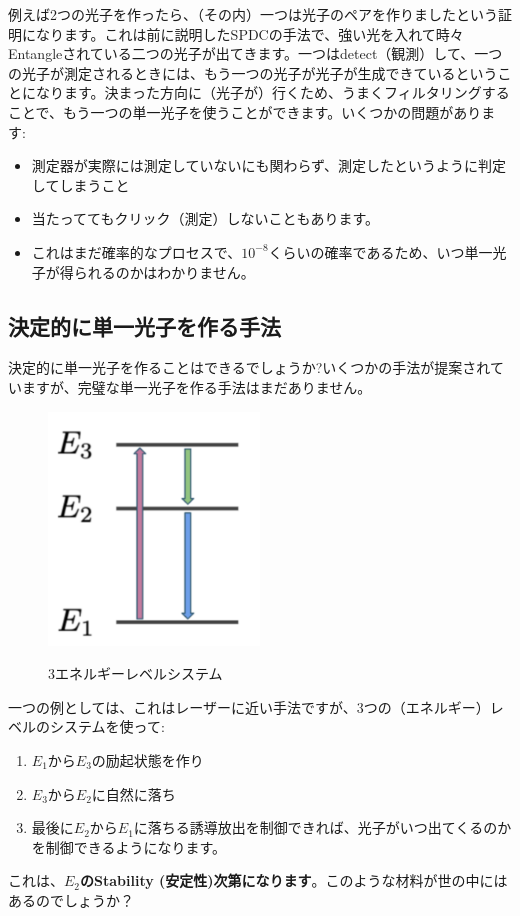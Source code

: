 例えば2つの光子を作ったら、（その内）一つは光子のペアを作りましたという証明になります。これは前に説明したSPDCの手法で、強い光を入れて時々Entangleされている二つの光子が出てきます。一つはdetect（観測）して、一つの光子が測定されるときには、もう一つの光子が光子が生成できているということになります。決まった方向に（光子が）行くため、うまくフィルタリングすることで、もう一つの単一光子を使うことができます。いくつかの問題があります:
\begin{itemize}
    \item 測定器が実際には測定していないにも関わらず、測定したというように判定してしまうこと
    \item 当たっててもクリック（測定）しないこともあります。
    \item これはまだ確率的なプロセスで、$10^{-8}$くらいの確率であるため、いつ単一光子が得られるのかはわかりません。
\end{itemize}
\subsection{決定的に単一光子を作る手法}
決定的に単一光子を作ることはできるでしょうか?いくつかの手法が提案されていますが、完璧な単一光子を作る手法はまだありません。
\begin{figure}[H]
    \centering
    \includegraphics[width=0.5\textwidth]{lesson5/3_stage_arrows.pdf}
    \label{図: 1}
    \caption{3エネルギーレベルシステム}
\end{figure}
一つの例としては、これはレーザーに近い手法ですが、3つの（エネルギー）レベルのシステムを使って:
\begin{enumerate}
    \item $E_1$から$E_3$の励起状態を作り
    \item $E_3$から$E_2$に自然に落ち
    \item 最後に$E_2$から$E_1$に落ちる誘導放出を制御できれば、光子がいつ出てくるのかを制御できるようになります。
\end{enumerate}
これは、\textbf{$E_2$のStability (安定性)次第になります}。このような材料が世の中にはあるのでしょうか？

